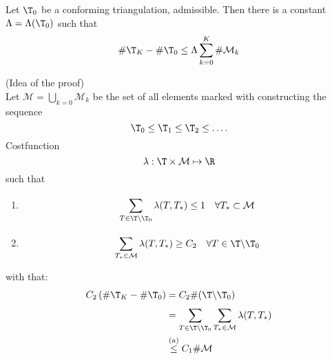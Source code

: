 \begin{enumerate}[label = \alph*)]
		\begin{theorem}
			Let $\T_{0}$ be a conforming triangulation, admissible. Then there is a constant $\Lambda = \Lambda(\T_{0})$ such that 
			\begin{equation*}
				\# \T_{K} - \# \T_{0} \leq \Lambda \sum\limits_{k=0}^{K} \#\mathcal{M}_{k}
			\end{equation*}
		\end{theorem}
		\begin{proof_}
			(Idea of the proof)\\
			Let $\mathcal{M} = \bigcup_{k=0} \mathcal{M}_{k}$ be the set of all elements marked with constructing the sequence
			 \begin{equation*}
				\T_{0} \leq \T_{1} \leq \T_{2}\leq \dots .
			\end{equation*}
			Costfunction
			\begin{equation*}
				\lambda: \T \times \mathcal{M} \mapsto \R
			\end{equation*}
			such that
			\begin{enumerate}[label = \alph*)]
				\item 
					\begin{equation*}
						\sum\limits_{T \in \T\backslash \T_{0}}^{} \lambda(T,T_{*}) \leq 1 \quad \forall T_{*} \subset \mathcal{M}
					\end{equation*}
				\item 
					\begin{equation*}
						\sum\limits_{T_{*}\in \mathcal{M}}^{} \lambda(T,T_{*}) \geq C_{2} \quad \forall T \in \T \backslash \T_{0}
					\end{equation*}
			\end{enumerate}
			with that:
			\begin{align*}
				C_{2} \left( \# \T_{K} - \# \T_{0} \right) &= C_{2}\# (\T\backslash \T_{0}) \\
														   &= \sum\limits_{T \in \T \backslash \T_{0} }^{} \sum\limits_{T_{*} \in \mathcal{M}}^{} \lambda(T,T_{*})\\
														   &\overset{(a)}{\leq} C_{1} \# \mathcal{M}
			\end{align*}
		\end{proof_}
\end{enumerate}

